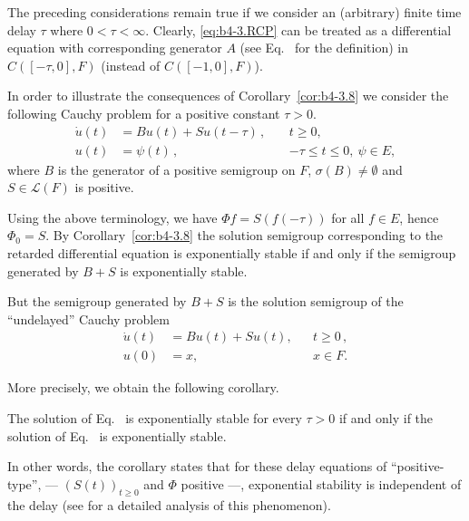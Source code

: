 The preceding considerations remain true if we consider an (arbitrary) finite time delay $\tau$ where $0 < \tau < \infty$. 
Clearly, \eqref{eq:b4-3.RCP} can be treated as a differential equation with corresponding generator $A$ (see Eq.~ for the definition) in $C([-\tau,0],F)$ (instead of\/ $C([-1,0],F)$).
\begin{example}\label{ex:b4-3.10}
	In order to illustrate the consequences of Corollary~\ref{cor:b4-3.8} we consider the  following Cauchy problem for a positive constant  $\tau > 0$.
	\begin{equation}\label{eq:b4-3.7}
		\begin{aligned}
		\dot{u}(t) &= Bu(t) + Su(t-\tau)\, , \ &&t \geq 0 ,\\
		u(t) &= \psi(t)\, , \ &&-\tau \leq t \leq 0  , \ \psi \in E ,
		\end{aligned}
	\end{equation}
	where $B$ is the generator of a positive semigroup on $F$, $\sigma(B) \neq \emptyset$ and $S \in \mathcal{L}(F)$ is positive.
	
	Using the above terminology, we have $\Phi f = S(f(-\tau))$ for all $f \in E$, hence $\Phi_{0} = S$. 
	By Corollary~\ref{cor:b4-3.8} the solution semigroup corresponding to the retarded differential equation  is exponentially stable if and only if the semigroup generated by $B + S$ is exponentially stable.
	
	But the semigroup generated by $B + S$ is the solution semigroup of the \enquote{undelayed} Cauchy problem
	\begin{equation}\label{eq:b4-3.8}
	\begin{aligned}
		\dot{u}(t) &= Bu(t) + Su(t) , &&t \geq 0\, ,\\
		u(0)       &= x ,             &&x \in F.
	\end{aligned}
	\end{equation}
\end{example}
More precisely, we obtain the following corollary.
\begin{corollary*}
    The solution of Eq.~ is exponentially stable for every $\tau > 0$ if and only if the solution of Eq.~ is exponentially stable.
\end{corollary*}
In other words, the corollary states that for these delay equations of \enquote{positive-type}, 
--- $(S(t))_{t\geq0}$ and $\Phi$ positive ---, 
exponential stability is independent of the delay (see \textcite{kerscher:1986} for a detailed analysis of this phenomenon).
	
